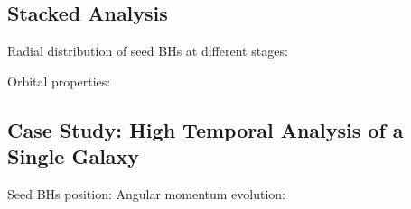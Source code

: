 \documentclass[useAMS,usenatbib]{mn2e}
\begin{document}
\subsection{Stacked Analysis}
Radial distribution of seed BHs at different stages:
%
%

Orbital properties:
%


\subsection{Case Study: High Temporal Analysis of a Single Galaxy}

Seed BHs position:
%
%
Angular momentum evolution:
\end{document}
